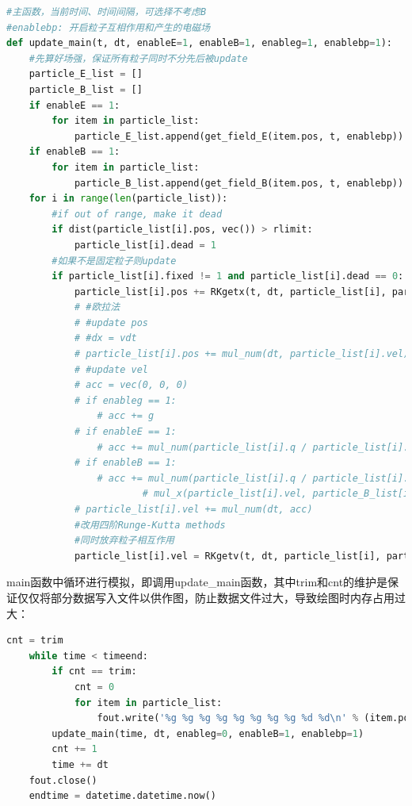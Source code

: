\documentclass[UTF-8,cs4size]{ctexart}
\begin{document}
\begin{lstlisting}[language=Python]
#主函数，当前时间、时间间隔，可选择不考虑B
#enablebp: 开启粒子互相作用和产生的电磁场
def update_main(t, dt, enableE=1, enableB=1, enableg=1, enablebp=1):
    #先算好场强，保证所有粒子同时不分先后被update
    particle_E_list = []
    particle_B_list = []
    if enableE == 1:
        for item in particle_list:
            particle_E_list.append(get_field_E(item.pos, t, enablebp))
    if enableB == 1:
        for item in particle_list:
            particle_B_list.append(get_field_B(item.pos, t, enablebp))
    for i in range(len(particle_list)):
        #if out of range, make it dead 
        if dist(particle_list[i].pos, vec()) > rlimit:
            particle_list[i].dead = 1
        #如果不是固定粒子则update
        if particle_list[i].fixed != 1 and particle_list[i].dead == 0:
            particle_list[i].pos += RKgetx(t, dt, particle_list[i], particle_E_list[i], particle_B_list[i], enableg, enableE, enableB)
            # #欧拉法
            # #update pos
            # #dx = vdt
            # particle_list[i].pos += mul_num(dt, particle_list[i].vel)
            # #update vel
            # acc = vec(0, 0, 0)
            # if enableg == 1:
                # acc += g
            # if enableE == 1:
                # acc += mul_num(particle_list[i].q / particle_list[i].m, particle_E_list[i])
            # if enableB == 1:
                # acc += mul_num(particle_list[i].q / particle_list[i].m, \
                        # mul_x(particle_list[i].vel, particle_B_list[i]))
            # particle_list[i].vel += mul_num(dt, acc)
            #改用四阶Runge-Kutta methods
            #同时放弃粒子相互作用
            particle_list[i].vel = RKgetv(t, dt, particle_list[i], particle_E_list[i], particle_B_list[i], enableg=0, enableE=1, enableB=1)
\end{lstlisting}
main函数中循环进行模拟，即调用update\_main函数，其中trim和cnt的维护是保证仅仅将部分数据写入文件以供作图，防止数据文件过大，导致绘图时内存占用过大：
\begin{lstlisting}[language=Python]
    cnt = trim
    while time < timeend:
        if cnt == trim:
            cnt = 0
            for item in particle_list:
                fout.write('%g %g %g %g %g %g %g %g %d %d\n' % (item.pos.x, item.pos.y, item.pos.z, item.vel.x, item.vel.y, item.vel.z, item.q, item.m, item.fixed, item.dead))
        update_main(time, dt, enableg=0, enableB=1, enablebp=1)
        cnt += 1
        time += dt
    fout.close()
    endtime = datetime.datetime.now()
\end{lstlisting}
\end{document}
